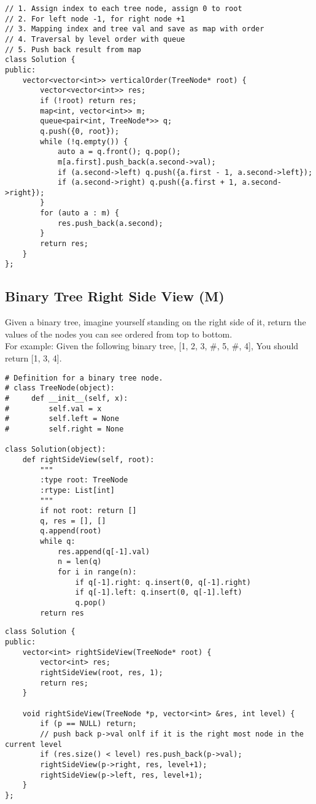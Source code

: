 \begin{lstlisting}
// 1. Assign index to each tree node, assign 0 to root
// 2. For left node -1, for right node +1
// 3. Mapping index and tree val and save as map with order
// 4. Traversal by level order with queue
// 5. Push back result from map
class Solution {
public:
    vector<vector<int>> verticalOrder(TreeNode* root) {
        vector<vector<int>> res;
        if (!root) return res;
        map<int, vector<int>> m;
        queue<pair<int, TreeNode*>> q;
        q.push({0, root});
        while (!q.empty()) {
            auto a = q.front(); q.pop();
            m[a.first].push_back(a.second->val);
            if (a.second->left) q.push({a.first - 1, a.second->left});
            if (a.second->right) q.push({a.first + 1, a.second->right});
        }
        for (auto a : m) {
            res.push_back(a.second);
        }
        return res;
    }
};
\end{lstlisting}


\subsection{Binary Tree Right Side View (M)}
Given a binary tree, imagine yourself standing on the right side of it, return the values of the nodes you can see ordered from top to bottom. \\

For example: Given the following binary tree, [1, 2, 3, \#, 5, \#, 4], You should return [1, 3, 4]. \\

\begin{lstlisting}
# Definition for a binary tree node.
# class TreeNode(object):
#     def __init__(self, x):
#         self.val = x
#         self.left = None
#         self.right = None

class Solution(object):
    def rightSideView(self, root):
        """
        :type root: TreeNode
        :rtype: List[int]
        """
        if not root: return []
        q, res = [], []
        q.append(root)
        while q:
            res.append(q[-1].val)
            n = len(q)
            for i in range(n):
                if q[-1].right: q.insert(0, q[-1].right)
                if q[-1].left: q.insert(0, q[-1].left)
                q.pop()
        return res
\end{lstlisting}

\begin{lstlisting}
class Solution {
public:
    vector<int> rightSideView(TreeNode* root) {
        vector<int> res;
        rightSideView(root, res, 1);
        return res;
    }
    
    void rightSideView(TreeNode *p, vector<int> &res, int level) {
        if (p == NULL) return;
        // push back p->val onlf if it is the right most node in the current level
        if (res.size() < level) res.push_back(p->val);
        rightSideView(p->right, res, level+1);
        rightSideView(p->left, res, level+1);
    }
};
\end{lstlisting}


